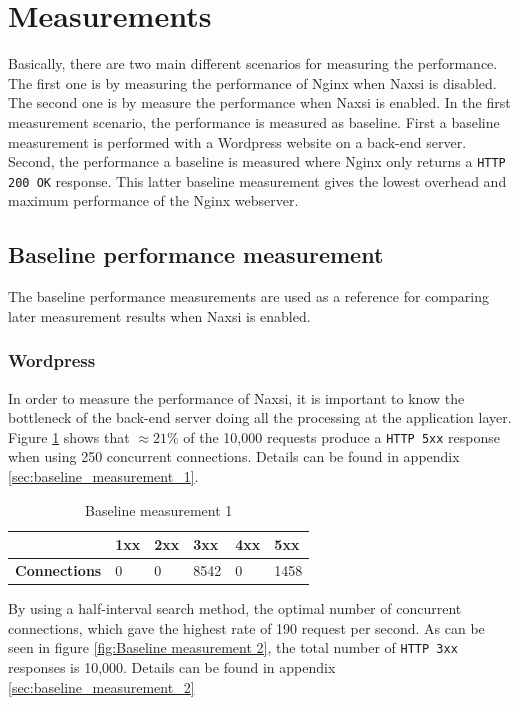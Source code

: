 \documentclass[Measurements]{subfiles}
\begin{document}
\section{Measurements}

\label{sec:Measurements}
Basically, there are two main different scenarios for measuring the performance. The first one is by measuring the performance of Nginx when Naxsi is disabled. The second one is by measure the performance when Naxsi is enabled.  In the first measurement scenario, the performance is measured as baseline. First a baseline measurement is performed with a Wordpress website on a back-end server. Second, the performance a baseline is measured where Nginx only returns a \verb+HTTP 200 OK+ response. This latter baseline measurement gives the lowest overhead and maximum performance of the Nginx webserver.

\subsection{Baseline performance measurement}
The baseline performance measurements are used as a reference for comparing later measurement results when Naxsi is enabled.

\subsubsection{Wordpress}
\label{sec:Baseline performance measurement}
In order to measure the performance of Naxsi, it is important to know the bottleneck of the back-end server doing all the processing at the application layer. Figure \ref{fig:Baseline measurement 1} shows that $\approx 21\%$ of the 10,000 requests produce a \verb+HTTP 5xx+ response when using 250 concurrent connections. Details can be found in appendix \ref{sec:baseline_measurement_1}.

\begin{table}[H]
\caption{Baseline measurement 1}
\begin{tabular}{|p{2cm}|p{}|p{}|p{}|p{}|p{}|}
\hline
 & \textbf{1xx} & \textbf{2xx} & \textbf{3xx} & \textbf{4xx} & \textbf{5xx} \\ \hline
\textbf{Connections} & 0 & 0 & 8542 & 0 & 1458 \\ \hline
\end{tabular}
\label{fig:Baseline measurement 1}
\end{table}

By using a half-interval search method, the optimal number of concurrent connections, which gave the highest rate of 190 request per second. As can be seen in figure \ref{fig:Baseline measurement 2}, the total number of \verb+HTTP 3xx+ responses is 10,000. Details can be found in appendix \ref{sec:baseline_measurement_2}
\end{document}
